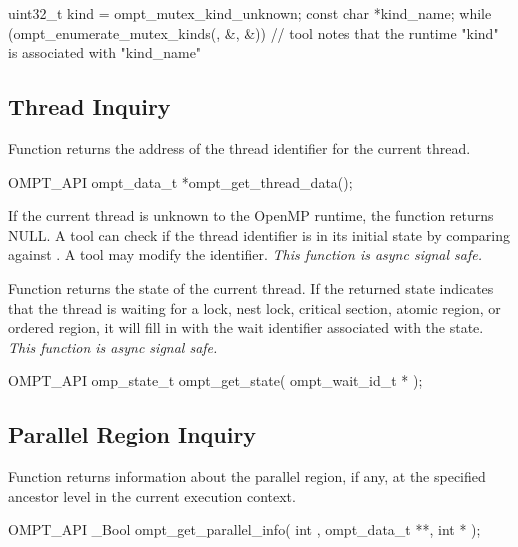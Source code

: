 \documentclass{article}
\begin{document}
\begin{boxedcode}
uint32\_t kind = ompt\_mutex\_kind\_unknown;
const char *kind\_name;
while (ompt\_enumerate\_mutex\_kinds(, &, &)) {
  // tool notes that the runtime "kind" is associated with "kind\_name" 
}
\end{boxedcode}


\subsection{Thread Inquiry}
\label{sec:thread-inquiry}

Function  returns the address of the thread 
identifier for the current thread.
\begin{boxedcode}
OMPT\_API ompt\_data\_t *ompt\_get\_thread\_data();
\end{boxedcode}
If the current thread is unknown to the OpenMP runtime, the function returns NULL.
A tool can check if the thread identifier is in its initial state by comparing against .
A tool may modify the identifier.
{\em This function is async signal safe.}

Function  returns the state of the 
current thread. If the returned state indicates that the thread is waiting for a lock, nest lock, critical section, atomic region, or ordered region, it will fill in  with the wait identifier associated with the state.  {\em This function is async signal safe.}

\begin{boxedcode}
OMPT\_API omp\_state\_t ompt\_get\_state(
  ompt\_wait\_id\_t *       
);
\end{boxedcode}
 
\subsection{Parallel Region Inquiry} 
\label{sec:parallel-inquiry} 
Function  returns information about the parallel region, if any, at the specified ancestor level in the current execution context.

\begin{boxedcode}
OMPT\_API \_Bool ompt\_get\_parallel\_info(
  int ,
  ompt\_data\_t **,
  int *
);
\end{boxedcode}
\end{document}
